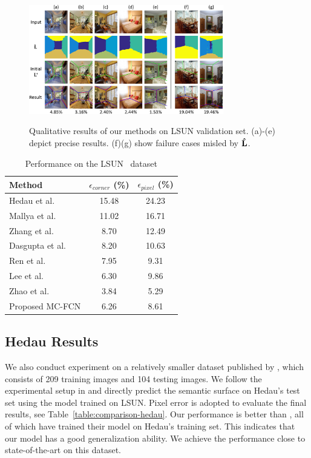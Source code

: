 \begin{figure}[!ht]
	\centering
	\textsc{\includegraphics[width=8.5cm]{figure/qualitive.png}}
	\caption{Qualitative results of our methods on LSUN validation set. (a)-(e) depict precise results. (f)(g) show failure cases misled by $\mathbf{\hat{L}}$. }
	\label{fig:qualitative}
\end{figure}

\begin{table}
	\centering 
	\begin{tabular}{lcc}
		\toprule
		Method & $\epsilon_{corner}$ (\%) & $\epsilon_{pixel}$ (\%) \\
		\midrule
		Hedau et al.~\cite{hedau2009recovering} & 15.48 & 24.23 \\
		Mallya et al.~\cite{mallya2015learning} & 11.02 & 16.71 \\
		Zhang et al.~\cite{zhang2017learning} & 8.70 & 12.49 \\
		Dasgupta et al.~\cite{dasgupta2016delay} & 8.20 & 10.63 \\
		Ren et al.~\cite{ren2016coarse} & 7.95 & 9.31 \\
		Lee et al.~\cite{LeeRoomNet17} & 6.30 & 9.86 \\
		Zhao et al.~\cite{zhao2017physics} & 3.84 & 5.29 \\
		\midrule
		Proposed MC-FCN & 6.26 & 8.61 \\
		\bottomrule
	\end{tabular}
	\caption{Performance on the LSUN~\cite{zhang2015large} dataset}	
	\label{table:comparison-lsun}
\end{table}

\subsection{Hedau Results}
\label{sec:Hedau}
We also conduct experiment on a relatively smaller dataset published by \cite{hedau2009recovering}, which consists of 209 training images and 104 testing images. We follow the experimental setup in \cite{LeeRoomNet17} and directly predict the semantic surface on Hedau's test set using the model trained on LSUN. Pixel error is adopted to evaluate the final results, see Table~\ref{table:comparison-hedau}. Our performance is better than \cite{mallya2015learning,zhang2017learning,ren2016three}, all of which have trained their model on Hedau's training set. This indicates that our model has a good generalization ability. We achieve the performance close to state-of-the-art on this dataset.

